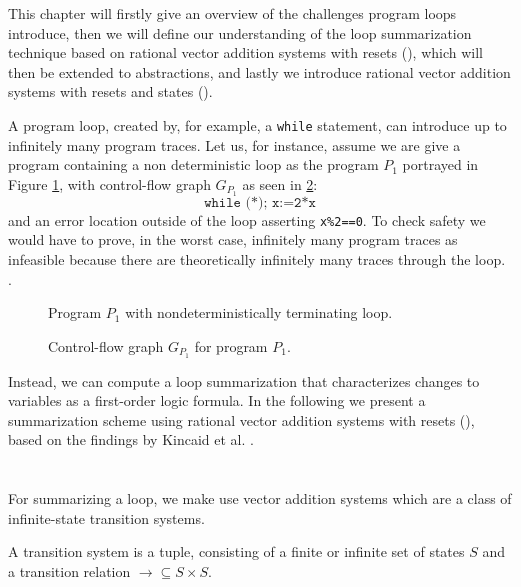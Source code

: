 This chapter will firstly give an overview of the challenges program loops introduce, then we will define our understanding of the loop summarization technique based on rational vector addition systems with resets (\qvasr), which will then be extended to \qvasr abstractions, and lastly we introduce rational vector addition systems with resets and states (\qvasrs). \par
A program loop, created by, for example, a \texttt{while} statement, can introduce up to infinitely many program traces. Let us, for instance, assume we are give a program containing a non deterministic loop as the program $P_1$ portrayed in Figure \ref{codeExMotAss}, with control-flow graph $G_{P_1}$ as seen in \ref{cfgExMotAss}: \begin{equation*}
	\texttt{while (*); x:=2*x}
\end{equation*}
and an error location outside of the loop asserting \texttt{x\%2==0}. To check safety we would have to prove, in the worst case, infinitely many program traces as infeasible because there are theoretically infinitely many traces through the loop.
.\begin{center}
	\begin{minipage}[b]{0.4\linewidth}
		\begin{figure}[H]
			\centering
			
			\caption{Program $P_1$ with nondeterministically terminating loop.}
			\label{codeExMotAss}
		\end{figure}
	\end{minipage}
	\hfill
	\begin{minipage}[b]{0.59\linewidth}
		\begin{figure}[H]
			\centering
			
			\caption{Control-flow graph $G_{P_1}$ for program $P_1$.}
			\label{cfgExMotAss}
		\end{figure}
	\end{minipage}
\end{center}
Instead, we can compute a loop summarization that characterizes changes to variables as a first-order logic formula. In the following we present a summarization scheme using rational vector addition systems with resets (\qvasr), based on the findings by Kincaid et al. \cite{DBLP:conf/cav/SilvermanK19}.
\section{\qvasr}
For summarizing a loop, we make use vector addition systems which are a class of infinite-state transition systems.
\begin{mydef}
	A transition system \transSys{} is a tuple, consisting of a finite or infinite set of states $S$ and a transition relation $\rightarrow \subseteq S \times S$.
\end{mydef}

